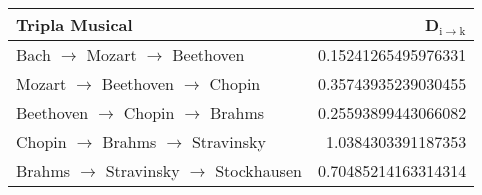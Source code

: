 \documentclass[11pt]{article}
\begin{document}
\begin{center}
\begin{tabular}{lr}
 Tripla Musical                             &  D$_{\mathrm{i \to k}}$  \\
\hline
 Bach $\to$ Mozart $\to$ Beethoven          &     0.15241265495976331  \\
 Mozart $\to$ Beethoven $\to$ Chopin        &     0.35743935239030455  \\
 Beethoven $\to$ Chopin $\to$ Brahms        &     0.25593899443066082  \\
 Chopin $\to$ Brahms $\to$ Stravinsky       &      1.0384303391187353  \\
 Brahms $\to$ Stravinsky $\to$ Stockhausen  &     0.70485214163314314  \\
\end{tabular}
\end{center}
\end{document}
